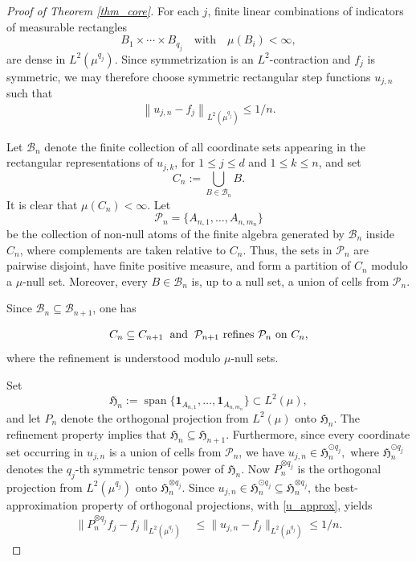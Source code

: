 \documentclass[ECP,preprint]{ejpecp}
\newcommand{\ind}{\mathbf{1}}
\newcommand{\AND}{\hspace{2mm}{\rm and}\hspace{2mm}}
\newcommand{\fH}{\mathfrak{H}}
\newcommand{\norm}[1]{\left\lVert #1\right\rVert}
\newcommand{\noi}{\noindent}
\begin{document}
\begin{proof}[Proof of Theorem \ref{thm_core}]
For each $j$, finite linear combinations of indicators of measurable
rectangles
\[
B_1\times\cdots\times B_{q_j}
\quad\text{with}
\quad
\mu(B_i)<\infty,
\]
are dense in $L^2(\mu^{q_j})$.  Since symmetrization is an
$L^2$-contraction and $f_j$ is symmetric, we may therefore choose
symmetric rectangular step functions $u_{j,n}$ such that
\noi
\begin{align}
\norm{u_{j,n}-f_j}_{L^2(\mu^{q_j})}
\leq  1/n.
\label{u_approx}
\end{align}

Let $\mathcal B_n$ denote the finite collection of all coordinate
sets appearing in the rectangular representations of $u_{j,k}$,
for $1\leq j\leq d$ and $1\leq k\leq n$, and set
\[
C_n
:=
\bigcup_{B\in\mathcal B_n}B.
\]
It is clear that $\mu(C_n)<\infty$.  Let
\[
\mathcal P_n
=
\{A_{n,1},\ldots,A_{n,m_n}\}
\]
be the collection of non-null atoms of the finite algebra generated
by $\mathcal B_n$ inside $C_n$, where complements are taken relative
to $C_n$.  Thus, the sets in $\mathcal P_n$ are pairwise disjoint,
have finite positive measure, and form a partition of $C_n$ modulo
a $\mu$-null set.  Moreover, every $B\in\mathcal B_n$ is, up to a
null set, a union of cells from $\mathcal P_n$.

Since $\mathcal B_n\subseteq\mathcal B_{n+1}$,
one has

\noi
\begin{align*}
C_n
\subseteq C_{n+1}
\AND
\mathcal P_{n+1}
\text{ refines }\mathcal P_n
\text{ on }C_n,
\end{align*}
where the refinement is understood modulo $\mu$-null sets.

Set
\[
\fH_n
:=
\operatorname{span}
\{
\ind_{A_{n,1}},\ldots,
\ind_{A_{n,m_n}}
\}
\subset L^2(\mu),
\]
and let $P_n$ denote the orthogonal projection from $L^2(\mu)$ onto
$\fH_n$.  The refinement property implies that
$
\fH_n\subseteq \fH_{n+1}.
$
Furthermore, since every coordinate set occurring in $u_{j,n}$ is
a union of cells from $\mathcal P_n$, we have
$
u_{j,n}\in \fH_n^{\odot q_j},
$
where  $\fH_n^{\odot q_j}$ denotes the $q_j$-th  symmetric tensor power of $\fH_n$.
Now $P_n^{\otimes q_j}$ is the orthogonal projection from
$L^2(\mu^{q_j})$ onto $\fH_n^{\otimes q_j}$.  Since
$u_{j,n}\in \fH_n^{\odot q_j}\subseteq \fH_n^{\otimes q_j}$, the
best-approximation property of orthogonal projections, with \eqref{u_approx},
 yields
\noi
\begin{align}
\| P_n^{\otimes q_j} f_j-f_j\|_{L^2(\mu^{q_j})}
&\leq \| u_{j,n}-f_j \|_{L^2(\mu^{q_j})}
\leq
1/n.
\label{Pn_approx}
\end{align}


\end{proof}
\end{document}
